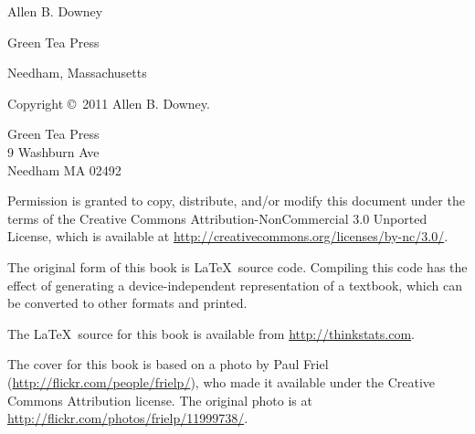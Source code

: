 \documentclass[12pt]{book}
\begin{document}
\begin{latexonly}
\begin{flushright}
{\Large
Allen B. Downey\\
}


\vspace{0.5in}

{\Large Green Tea Press}

{\small Needham, Massachusetts}

\vfill

\end{flushright}


\pagebreak
\thispagestyle{empty}

{\small
Copyright \copyright ~2011 Allen B. Downey.


\vspace{0.2in}

\begin{flushleft}
Green Tea Press       \\
9 Washburn Ave \\
Needham MA 02492
\end{flushleft}

Permission is granted to copy, distribute, and/or modify this document
under the terms of the Creative Commons Attribution-NonCommercial 3.0 Unported
License, which is available at \url{http://creativecommons.org/licenses/by-nc/3.0/}.

The original form of this book is \LaTeX\ source code.  Compiling this
code has the effect of generating a device-independent representation
of a textbook, which can be converted to other formats and printed.

The \LaTeX\ source for this book is available from
\url{http://thinkstats.com}.

The cover for this book is based on a photo by Paul Friel
(\url{http://flickr.com/people/frielp/}), who made it available under
the Creative Commons Attribution license.  The original photo
is at \url{http://flickr.com/photos/frielp/11999738/}.

\vspace{0.2in}

} %

\end{latexonly}


\end{document}
